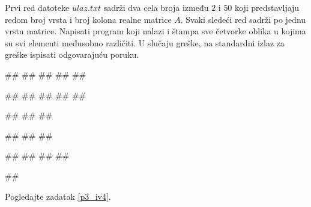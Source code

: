 \begin{Exercise}[label=p3_x6]         
Prvi red datoteke $ulaz.txt$ sadrži dva cela broja između $2$ i $50$
koji predstavljaju redom broj vrsta i broj kolona realne matrice
$A$. Svaki sledeći red sadrži po jednu vrstu matrice. Napisati
program koji nalazi i štampa sve četvorke oblika
 u kojima su svi
elementi međusobno različiti.
U slučaju greške, na standardni izlaz za greške ispisati odgovarajuću poruku.

\begin{minitest}
\begin{upotreba}{1}
##
##
##
##
##

#\naslovIzlaz#
##
##
##
##
\end{upotreba}
\end{minitest}
\begin{minitest}
\begin{upotreba}{2}
##
##
##

#\naslovIzlazZaGresku#
##
##
\end{upotreba}
\end{minitest}
\begin{minitest}
\begin{upotreba}{3}
##
##
##
##

#\naslovIzlaz#
\end{upotreba}
\end{minitest}
\end{Exercise}
\begin{Answer}[ref=p3_x6]
Pogledajte zadatak \ref{p3_iv4}.
\end{Answer}





